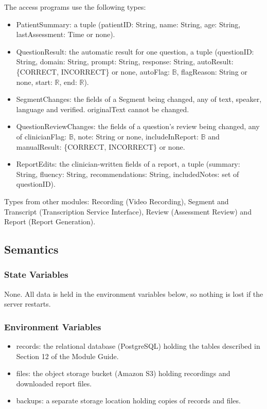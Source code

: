 \documentclass[12pt, titlepage]{article}
\begin{document}
\noindent The access programs use the following types:
\begin{itemize}
\item PatientSummary: a tuple (patientID: String, name: String, age: String, lastAssessment: Time or none).
\item QuestionResult: the automatic result for one question, a tuple (questionID: String, domain: String, prompt: String, response: String, autoResult: \{CORRECT, INCORRECT\} or none, autoFlag: $\mathbb{B}$, flagReason: String or none, start: $\mathbb{R}$, end: $\mathbb{R}$).
\item SegmentChanges: the fields of a Segment being changed, any of text, speaker, language and verified. originalText cannot be changed.
\item QuestionReviewChanges: the fields of a question's review being changed, any of clinicianFlag: $\mathbb{B}$, note: String or none, includeInReport: $\mathbb{B}$ and manualResult: \{CORRECT, INCORRECT\} or none.
\item ReportEdits: the clinician-written fields of a report, a tuple (summary: String, fluency: String, recommendations: String, includedNotes: set of questionID).
\end{itemize}
Types from other modules: Recording (Video Recording), Segment and Transcript (Transcription Service Interface), Review (Assessment Review) and Report (Report Generation).

\subsection{Semantics}

\subsubsection{State Variables}
None. All data is held in the environment variables below, so nothing is lost if the server restarts.

\subsubsection{Environment Variables}
\begin{itemize}
\item records: the relational database (PostgreSQL) holding the tables described in Section 12 of the Module Guide.
\item files: the object storage bucket (Amazon S3) holding recordings and downloaded report files.
\item backups: a separate storage location holding copies of records and files.
\end{itemize}
\end{document}
